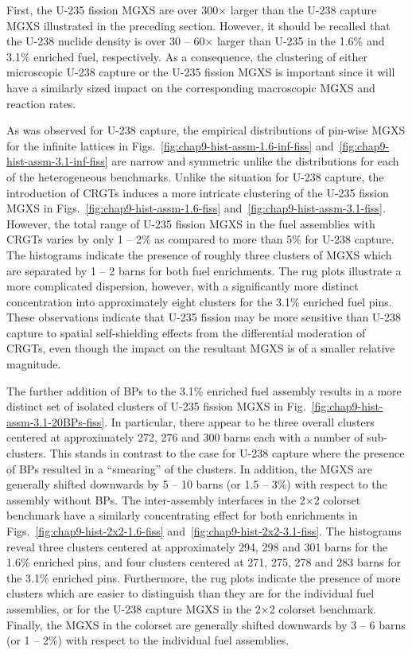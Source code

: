 First, the U-235 fission \ac{MGXS} are over 300$\times$ larger than the U-238 capture \ac{MGXS} illustrated in the preceding section. However, it should be recalled that the U-238 nuclide density is over 30 -- 60$\times$ larger than U-235 in the 1.6\% and 3.1\% enriched fuel, respectively. As a consequence, the clustering of either microscopic U-238 capture or the U-235 fission \ac{MGXS} is important since it will have a similarly sized impact on the corresponding macroscopic \ac{MGXS} and reaction rates.

As was observed for U-238 capture, the empirical distributions of pin-wise \ac{MGXS} for the infinite lattices in Figs.~\ref{fig:chap9-hist-assm-1.6-inf-fiss} and~\ref{fig:chap9-hist-assm-3.1-inf-fiss} are narrow and symmetric unlike the distributions for each of the heterogeneous benchmarks. Unlike the situation for U-238 capture, the introduction of \acp{CRGT} induces a more intricate clustering of the U-235 fission \ac{MGXS} in Figs.~\ref{fig:chap9-hist-assm-1.6-fiss} and~\ref{fig:chap9-hist-assm-3.1-fiss}. However, the total range of U-235 fission \ac{MGXS} in the fuel assemblies with \acp{CRGT} varies by only 1 -- 2\% as compared to more than 5\% for U-238 capture. The histograms indicate the presence of roughly three clusters of \ac{MGXS} which are separated by 1 -- 2 barns for both fuel enrichments. The rug plots illustrate a more complicated dispersion, however, with a significantly more distinct concentration into approximately eight clusters for the 3.1\% enriched fuel pins. These observations indicate that U-235 fission may be more sensitive than U-238 capture to spatial self-shielding effects from the differential moderation of \acp{CRGT}, even though the impact on the resultant \ac{MGXS} is of a smaller relative magnitude. 

The further addition of \acp{BP} to the 3.1\% enriched fuel assembly results in a more distinct set of isolated clusters of U-235 fission \ac{MGXS} in Fig.~\ref{fig:chap9-hist-assm-3.1-20BPs-fiss}. In particular, there appear to be three overall clusters centered at approximately 272, 276 and 300 barns each with a number of sub-clusters. This stands in contrast to the case for U-238 capture where the presence of \acp{BP} resulted in a ``smearing'' of the clusters. In addition, the \ac{MGXS} are generally shifted downwards by 5 -- 10  barns (or 1.5 -- 3\%) with respect to the assembly without \acp{BP}. The inter-assembly interfaces in the 2$\times$2 colorset benchmark have a similarly concentrating effect for both enrichments in Figs.~\ref{fig:chap9-hist-2x2-1.6-fiss} and~\ref{fig:chap9-hist-2x2-3.1-fiss}. The histograms reveal three clusters centered at approximately 294, 298 and 301 barns for the 1.6\% enriched pins, and four clusters centered at 271, 275, 278 and 283 barns for the 3.1\% enriched pins. Furthermore, the rug plots indicate the presence of more clusters which are easier to distinguish than they are for the individual fuel assemblies, or for the U-238 capture \ac{MGXS} in the 2$\times$2 colorset benchmark. Finally, the \ac{MGXS} in the colorset are generally shifted downwards by 3 -- 6  barns (or 1 -- 2\%) with respect to the individual fuel assemblies.

